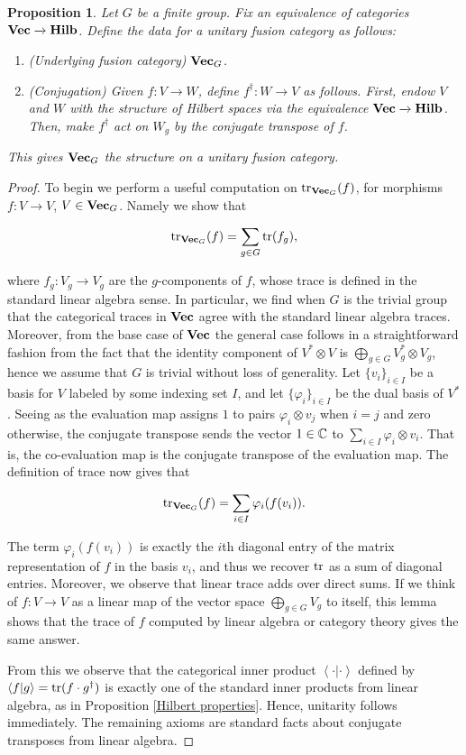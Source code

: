 \documentclass{article}
\newtheorem{proposition}{Proposition}[section]
\theoremstyle{definition}
\numberwithin{figure}{section}
\begin{document}
\begin{proposition} Let $G$ be a finite group. Fix an equivalence of categories $\bold{Vec}\xrightarrow{}\bold{Hilb}$. Define the data for a unitary fusion category as follows:

\begin{enumerate}
\item (Underlying fusion category) $\bold{Vec}_{G}$.
\item (Conjugation) Given $f:V\to W$, define $f^{\dagger}:W\to V$ as follows. First, endow $V$ and $W$ with the structure of Hilbert spaces via the equivalence $\bold{Vec}\xrightarrow{}\bold{Hilb}$. Then, make $f^{\dagger}$ act on $W_g$ by the conjugate transpose of $f$.
\end{enumerate}

This gives $\bold{Vec}_G$ the structure on a unitary fusion category.
\end{proposition}
\begin{proof} To begin we perform a useful computation on $\mathrm{tr}_{\bold{Vec}_G}(f)$, for morphisms $f:V\to V$, $V\in \bold{Vec}_G$. Namely we show that

$$\mathrm{tr}_{\bold{Vec}_G}(f)=\sum_{g\in G}\mathrm{tr}(f_g),$$

where $f_g: V_g\to V_g$ are the $g$-components of $f$, whose trace is defined in the standard linear algebra sense. In particular, we find when $G$ is the trivial group that the categorical traces in $\bold{Vec}$ agree with the standard linear algebra traces. Moreover, from the base case of $\bold{Vec}$ the general case follows in a straightforward fashion from the fact that the identity component of $V^{*}\otimes V$ is $\bigoplus_{g\in G}V_g^{*}\otimes V_g$, hence we assume that $G$ is trivial without loss of generality. Let $\{v_i\}_{i\in I}$ be a basis for $V$ labeled by some indexing set $I$, and let $\{\varphi_i\}_{i\in I}$ be the dual basis of $V^{*}$. Seeing as the evaluation map assigns $1$ to pairs $\varphi_i\otimes v_j$ when $i=j$ and zero otherwise, the conjugate transpose sends the vector $1\in \mathbb{C}$ to $\sum_{i\in I}\varphi_i\otimes v_i$. That is, the co-evaluation map is the conjugate transpose of the evaluation map. The definition of trace now gives that

$$\mathrm{tr}_{\bold{Vec}_G}(f)=\sum_{i\in I}\varphi_i(f(v_i)).$$

The term $\varphi_i(f(v_i))$ is exactly the $i$th diagonal entry of the matrix representation of $f$ in the basis $v_i$, and thus we recover $\mathrm{tr}$ as a sum of diagonal entries. Moreover, we observe that linear trace adds over direct sums. If we think of $f:V\to V$ as a linear map of the vector space $\bigoplus_{g\in G}V_g$ to itself, this lemma shows that the trace of $f$ computed by linear algebra or category theory gives the same answer.

From this we observe that the categorical inner product $\left<\cdot | \cdot \right>$ defined by $\left<f|g\right>=\mathrm{tr}(f\cdot g^{\dagger})$ is exactly one of the standard inner products from linear algebra, as in Proposition \ref{Hilbert properties}. Hence, unitarity follows immediately. The remaining axioms are standard facts about conjugate transposes from linear algebra.
\end{proof}
\end{document}
